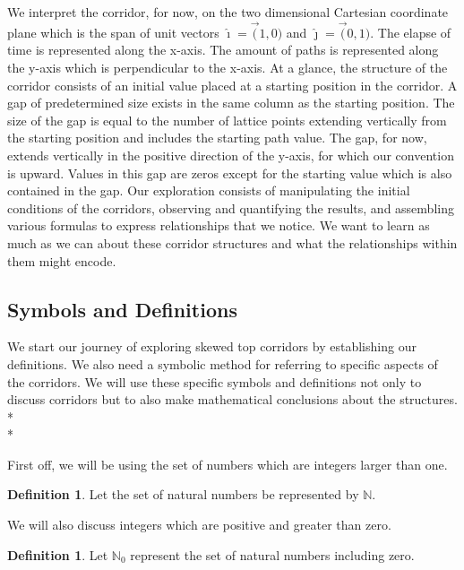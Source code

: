 \documentclass{article}
\newcommand\tab[1][1cm]{\hspace*{#1}}
\newcommand*{\set}[1]{\mathbb{#1}}
\theoremstyle{definition}
\newtheorem{defn}[thm]{Definition}
\begin{document}
  \tab We interpret the corridor, for now, on the two dimensional Cartesian coordinate plane which is the span of unit  
  vectors $\hat{\imath} = \vec(1, 0)$ and $\hat{\jmath} = \vec(0, 1)$. The elapse of time is represented along the x-axis.  
  The amount of paths is represented along the y-axis which is perpendicular to the x-axis. At a glance, the structure 
  of the corridor consists of an initial value placed at a starting position in the corridor. A gap of predetermined size 
  exists in the same column as the starting position. The size of the gap is equal to the number of lattice points extending    
  vertically from the starting position and includes the starting path value. The gap, for now, extends vertically in the   
  positive direction of the y-axis, for which our convention is upward. Values in this gap are zeros except for the starting 
  value which is also contained in the gap. Our exploration consists of manipulating the initial conditions of the corridors, 
  observing and quantifying the results, and assembling various formulas to express relationships that we notice. We want to 
  learn as much as we can about these corridor structures and what the relationships within them might encode.\par
  
  \subsection*{Symbols and Definitions}
  \tab We start our journey of exploring skewed top corridors by establishing our definitions. We also need a symbolic method 
  for referring to specific aspects of the corridors. We will use these specific symbols and definitions not only to discuss 
  corridors but to also make mathematical conclusions about the structures.\\*\\*
  
  \noindent First off, we will be using the set of numbers which are integers larger than one.
  \begin{defn} Let the set of natural numbers be represented by $\set{N}$.\\ \end{defn}\par
  
  \noindent We will also discuss integers which are positive and greater than zero. 
  \begin{defn} Let $\set{N}_0$ represent the set of natural numbers including zero. \end{defn}
  
\end{document}
